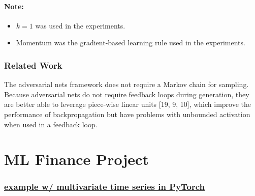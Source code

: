 \paragraph*{Note: }
\begin{itemize}
\item
	$k=1$ was used in the experiments.
\item
	Momentum was the gradient-based learning rule used in the experiments.
\end{itemize}

\subsubsection*{Related Work}

The adversarial nets framework does not require a Markov chain for sampling. Because adversarial nets do not require feedback loops during generation, they are better able to leverage piece-wise linear units [19, 9, 10], which improve the performance of backpropagation but have problems with unbounded activation when used in a feedback loop.



\section{ML Finance Project}

\subsubsection*{\href{https://stackabuse.com/time-series-prediction-using-lstm-with-pytorch-in-python/}{example w/ multivariate time series in PyTorch}}



